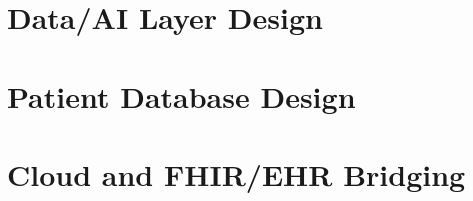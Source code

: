 \documentclass[12pt]{article}
\begin{document}
\section{Data/AI Layer Design}




\section{Patient Database Design}



\section{Cloud and FHIR/EHR Bridging}
\end{document}
